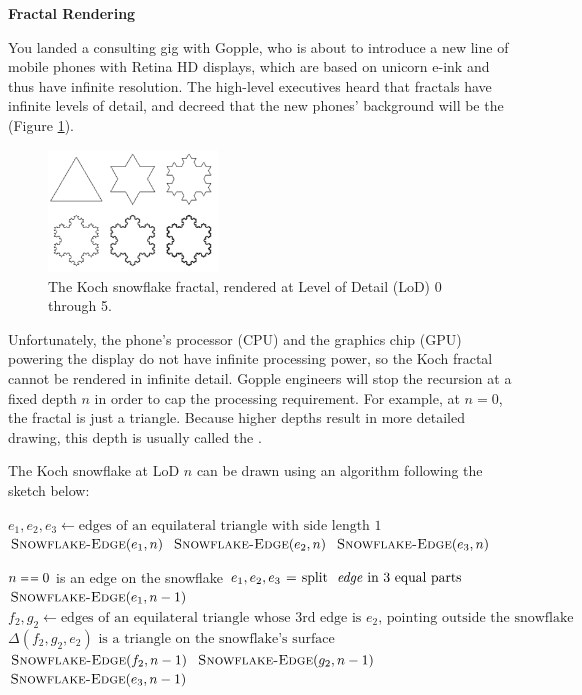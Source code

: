 \documentclass[12pt,twoside]{article}
\begin{document}
\begin{problems}

\problem {} \textbf{Fractal Rendering}

You landed a consulting gig with Gopple, who is about to introduce a new line
of mobile phones with Retina HD displays, which are based on unicorn e-ink and thus
have infinite resolution. The high-level executives heard that fractals have
infinite levels of detail, and decreed that the new phones' background will be
the   (Figure \ref{fig:snowflake}).

\begin{figure}[htbp]
\centering
\includegraphics[width=0.4\textwidth]{figures/snowflake.pdf}
\caption{The Koch snowflake fractal, rendered at Level of Detail (LoD) 0 through 5.}
\label{fig:snowflake}
\end{figure}

Unfortunately, the phone's processor (CPU) and the graphics chip (GPU) powering
the display do not have infinite processing power, so the Koch fractal cannot be
rendered in infinite detail. Gopple engineers will stop the recursion at a
fixed depth $n$ in order to cap the processing requirement. 
For example, at $n=0$, the fractal is just a triangle.
Because higher depths result in more detailed drawing, this depth is usually
called the .

The Koch snowflake at LoD $n$ can be drawn using an algorithm following the
sketch below:

\begin{codebox} 
\li $e_1, e_2, e_3 \gets
\textrm{edges of an equilateral triangle with side length }1$
\li $\textnormal{\scshape Snowflake-Edge}(e_1, n)$
\li $\textnormal{\scshape Snowflake-Edge}(e_2, n)$
\li $\textnormal{\scshape Snowflake-Edge}(e_3, n)$
\end{codebox}

\begin{codebox}
\li \If $n \isequal 0$
\li   \Then \textrm{ is an edge on the snowflake}
\li \Else
\li   $e_1, e_2, e_3 \gets \textrm{split \id{edge} in 3 equal parts}$
\li   $\textnormal{\scshape Snowflake-Edge}(e_1, n - 1)$
\li   $f_2, g_2 \gets \textrm{edges of an equilateral triangle whose 3rd edge
is } e_2 \textrm{, pointing outside the snowflake}$
\li   $\textrm{$\Delta(f_2,g_2,e_2)$ is a triangle on the snowflake's surface}$
\li   $\textnormal{\scshape Snowflake-Edge}(f_2, n - 1)$
\li   $\textnormal{\scshape Snowflake-Edge}(g_2, n - 1)$
\li   $\textnormal{\scshape Snowflake-Edge}(e_3, n - 1)$
    \End
\end{codebox}


\end{problems}
\end{document}
